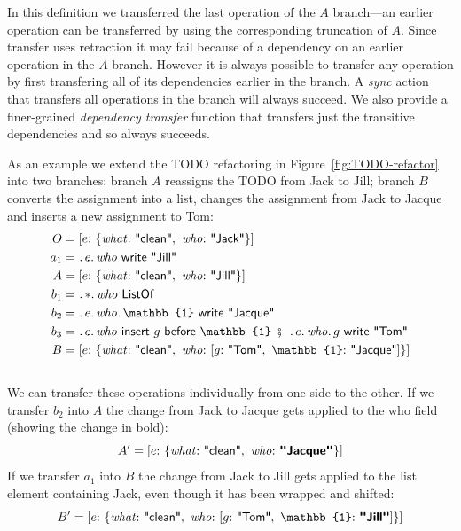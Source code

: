 \documentclass[english,submission]{programming}
\theoremstyle{definition}
\newcommand{\mathbox}[1]{\colorbox{black!10}{$#1$\phantom{i\hspace{-3.5pt}}}}
\DeclareMathOperator{\exec}{\ \fatsemi\ \ }
\newcommand{\is}{{:}\ }
\newcommand{\comma}{,\ }
\newcommand{\quotedstring}[1]{\textsf{\textquotedbl{#1}\textquotedbl}}
\begin{document}
In this definition we transferred the last operation of the \mathbox{A} branch---an earlier operation can be transferred by using the corresponding truncation of \mathbox{A}.
Since transfer uses retraction it may fail because of a dependency on an earlier operation in the \mathbox{A} branch. However it is always possible to transfer any operation by first transfering all of its dependencies earlier in the branch. A \textit{sync} action that transfers all operations in the branch will always succeed. We also provide a finer-grained \textit{dependency transfer} function that transfers just the transitive dependencies and so always succeeds.

As an example we extend the TODO refactoring in Figure~\ref{fig:TODO-refactor} into two branches: branch \mathbox{A} reassigns the TODO from Jack to Jill; branch \mathbox{B} converts the assignment into a list, changes the assignment from Jack to Jacque and inserts a new assignment to Tom:
\begin{align*}
  O &= [
    e \is \{ \mathit{what}\is \quotedstring{clean}\comma  \mathit{who}\is \quotedstring{Jack} \}
    ] \\
  a_1 &= \ \ldotp e\ldotp\mathit{who}\textsf{ write } \quotedstring{Jill}\\
  A &= [
    e \is \{ \mathit{what}\is \quotedstring{clean}\comma  \mathit{who}\is \quotedstring{Jill} \}
    ] \\
  b_1 &= \ \ldotp *\ldotp \mathit{who} \textsf{ ListOf } \\
  b_2 &= \ \ldotp e\ldotp\mathit{who}\ldotp\mathbb{1} \textsf{ write } \quotedstring{Jacque} \\
  b_3 &= \ \ldotp e\ldotp\mathit{who} \textsf{ insert } g \textsf{ before } \mathbb{1} \exec \ldotp e\ldotp\mathit{who}\ldotp g \textsf{ write } \quotedstring{Tom} \\
  B &= [
    e \is \{ \mathit{what}\is \quotedstring{clean}\comma  \mathit{who}\is
    [ g \is \quotedstring{Tom} \comma \mathbb{1}\is \quotedstring{Jacque}] \}
    ] \\
  \end{align*}
  \vspace{-30pt}\\
We can transfer these operations individually from one side to the other.
If we transfer \mathbox{b_2} into \mathbox{A} the change from Jack to Jacque gets applied to the \textsf{who} field (showing the change in bold):
\[A' = [e \is \{ \mathit{what}\is \quotedstring{clean}\comma  \mathit{who}\is \textbf{\quotedstring{Jacque}} \}]\]
If we transfer \mathbox{a_1} into \mathbox{B} the change from Jack to Jill gets applied to the list element containing Jack, even though it has been wrapped and shifted:\\
\[B' = [
    e \is \{ \mathit{what}\is \quotedstring{clean}\comma  \mathit{who}\is
    [ g \is \quotedstring{Tom} \comma \mathbb{1}\is \textbf{\quotedstring{Jill}}] \}
]\]
\end{document}
